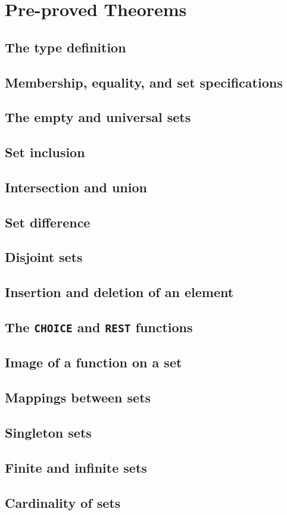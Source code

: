 \chapter{Pre-proved Theorems}

\section{The type definition}
\section{Membership, equality, and set specifications}
\section{The empty and universal sets}
\section{Set inclusion}
\section{Intersection and union}
\section{Set difference}
\section{Disjoint sets}
\section{Insertion and deletion of an element}
\section{The {\tt CHOICE} and {\tt REST} functions}
\section{Image of a function on a set}
\section{Mappings between sets}
\section{Singleton sets}
\section{Finite and infinite sets}
\section{Cardinality of sets}
